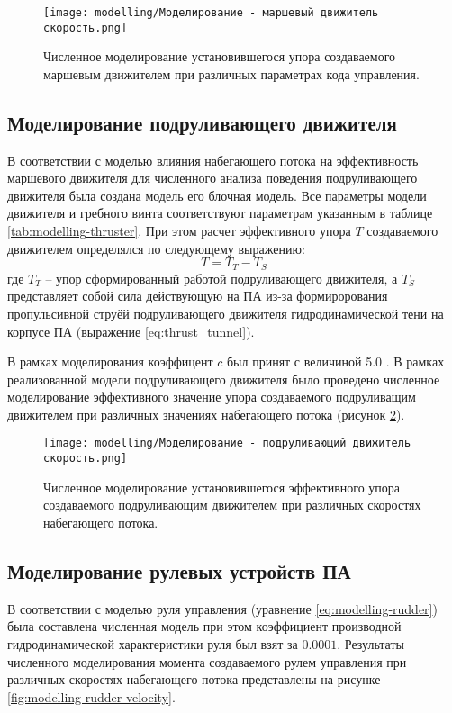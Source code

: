 \begin{figure}[ht]
    \centering
    \texttt{[image: modelling/Моделирование - маршевый движитель скорость.png]}
    \caption{Численное моделирование установившегося  упора создаваемого маршевым движителем при различных параметрах кода управления.}
    \label{fig:modelling-thruster-code}
\end{figure}

\subsection{Моделирование подруливающего движителя}

В соответствии с моделью влияния набегающего потока на эффективность маршевого движителя для численного анализа поведения подруливающего движителя была создана модель его блочная модель.
Все параметры модели движителя и гребного винта соответствуют параметрам указанным в таблице \ref{tab:modelling-thruster}.
При этом расчет эффективного упора $T$ создаваемого движителем определялся по следующему выражению:
\begin{equation*}
    T = T_T - T_S
\end{equation*}
\noindent где $T_T$ -- упор сформированный работой подруливающего движителя, а $T_S$ представляет собой сила действующую на ПА из-за формирорования пропульсивной струёй подруливающего движителя гидродинамической тени на корпусе ПА (выражение \ref{eq:thrust_tunnel}).

В рамках моделирования коэффицент $c$ был принят с величиной 5.0 \cite{palmer2009experimental}.
В рамках реализованной модели подруливающего движителя было проведено численное моделирование эффективного значение упора создаваемого подруливащим движителем при различных значениях набегающего потока (рисунок \ref{fig:modelling-tunnel-velocity}).

\begin{figure}[ht]
    \centering
    \texttt{[image: modelling/Моделирование - подруливающий движитель скорость.png]}
    \caption{Численное моделирование установившегося эффективного упора создаваемого подруливающим движителем при различных скоростях набегающего потока.}
    \label{fig:modelling-tunnel-velocity}
\end{figure}

\subsection{Моделирование рулевых устройств ПА}
В соответствии с моделью руля управления (уравнение \ref{eq:modelling-rudder}) была составлена численная модель при этом коэффициент производной гидродинамической характеристики руля был взят за $0.0001$.
Результаты численного моделирования момента создаваемого рулем управления при различных скоростях набегающего потока представлены на рисунке \ref{fig:modelling-rudder-velocity}.


